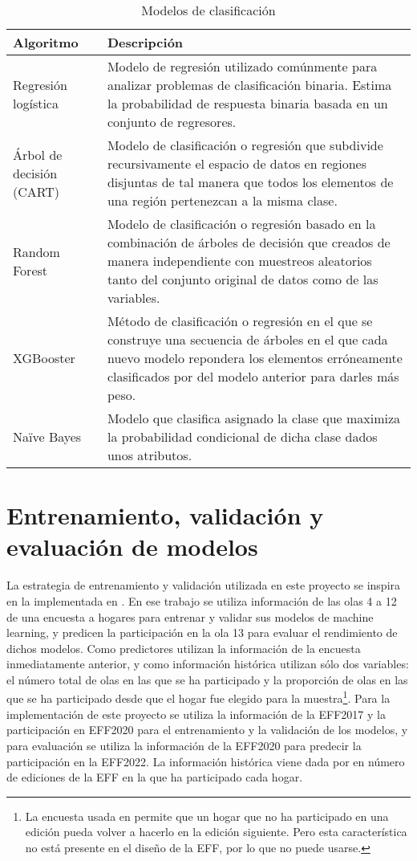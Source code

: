 \begin{table}[htbp]
\centering{}
\begin{tabular}{l p{10cm}}
\hline
\textbf{Algoritmo} & \textbf{Descripción} \\ \hline
Regresión logística & Modelo de regresión utilizado comúnmente para analizar problemas de clasificación binaria. Estima la probabilidad de respuesta binaria basada en un conjunto de regresores. \\ \hline
Árbol de decisión (CART) & Modelo de clasificación o regresión que subdivide recursivamente el espacio de datos en regiones disjuntas de tal manera que todos los elementos de una región pertenezcan a la misma clase. \\ \hline
Random Forest & Modelo de clasificación o regresión basado en la combinación  de árboles de decisión que creados de manera independiente con muestreos aleatorios tanto del conjunto original de datos como de las variables. \\ \hline
XGBooster & Método de clasificación o regresión en el que se construye una secuencia de árboles en el que cada nuevo modelo repondera los elementos erróneamente clasificados por del modelo anterior para darles más peso. \\ \hline
Naïve Bayes & Modelo que clasifica asignado la clase que maximiza la probabilidad condicional de dicha clase dados unos atributos. \\ \hline
\end{tabular}
\caption{Modelos de clasificación}
\label{table:classifiers}
\end{table}

\section{Entrenamiento, validación y evaluación de modelos}

La estrategia de entrenamiento y validación utilizada en este proyecto se inspira en la implementada en \cite{beste2023case}. En ese trabajo se utiliza información de las olas 4 a 12 de una encuesta a hogares para entrenar y validar sus modelos de machine learning, y predicen la participación en la ola 13 para evaluar el rendimiento de dichos modelos. Como predictores utilizan la información de la encuesta inmediatamente anterior, y como información histórica utilizan sólo dos variables: el número total de olas en las que se ha participado y la proporción de olas en las que se ha participado desde que el hogar fue elegido para la muestra\footnote{La encuesta usada en \cite{beste2023case} permite que un hogar que no ha participado en una edición pueda volver a hacerlo en la edición siguiente. Pero esta característica no está presente en el diseño de la EFF, por lo que no puede usarse.}. Para la implementación de este proyecto se utiliza la información de la EFF2017 y la participación en EFF2020 para el entrenamiento y la validación de los modelos, y para evaluación se utiliza la información de la EFF2020 para predecir la participación en la EFF2022. La información histórica viene dada por en número de ediciones de la EFF en la que ha participado cada hogar.

